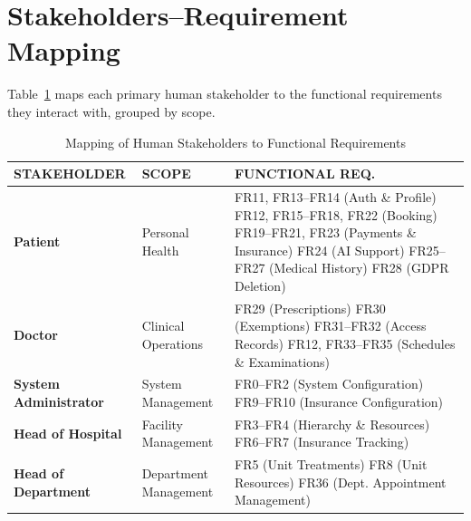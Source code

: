 \documentclass[12pt, a4paper]{article}
\begin{document}
\newpage
\section{Stakeholders--Requirement Mapping}

Table~\ref{tab:user_fr_mapping_fixed} maps each primary human stakeholder to the functional requirements they interact with, grouped by scope. 

\begin{table}[h!]
\centering
\renewcommand{\arraystretch}{1.5}
\begin{tabularx}{\textwidth}{|l|l|X|}
\hline
\rowcolor{gray!30} 
\textbf{STAKEHOLDER} & \textbf{SCOPE} & \textbf{FUNCTIONAL REQ.} \\ \hline

\rowcolor{blue!10}
\textbf{Patient} & Personal Health & 
FR11, FR13--FR14 (Auth \& Profile) \newline
FR12, FR15--FR18, FR22 (Booking) \newline
FR19--FR21, FR23 (Payments \& Insurance) \newline
FR24 (AI Support) \newline
FR25--FR27 (Medical History) \newline
FR28 (GDPR Deletion)  \\ \hline

\rowcolor{green!10}
\textbf{Doctor} & Clinical Operations &
FR29 (Prescriptions) \newline
FR30 (Exemptions) \newline
FR31--FR32 (Access Records) \newline
FR12, FR33--FR35 (Schedules \& Examinations) \\ \hline

\rowcolor{orange!20}
\textbf{System Administrator} & System Management & 
FR0--FR2 (System Configuration) \newline
FR9--FR10 (Insurance Configuration) \\ \hline

\rowcolor{yellow!20}
\textbf{Head of Hospital} & Facility Management & 
FR3--FR4 (Hierarchy \& Resources) \newline
FR6--FR7 (Insurance Tracking)\\ \hline

\rowcolor{yellow!10}
\textbf{Head of Department} & Department Management & 
FR5 (Unit Treatments) \newline
FR8 (Unit Resources)\newline
FR36 (Dept. Appointment Management)  \\ \hline
\end{tabularx}
\caption{Mapping of Human Stakeholders to Functional Requirements}
\label{tab:user_fr_mapping_fixed}
\end{table}
\newpage
\end{document}
